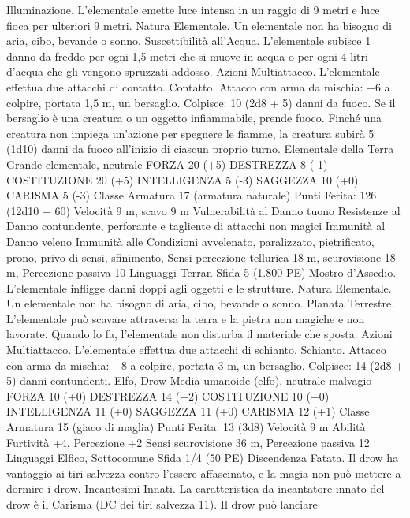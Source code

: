 \begin{multicols}{2}
Illuminazione. L’elementale emette luce intensa in un raggio di
9 metri e luce fioca per ulteriori 9 metri.
Natura Elementale. Un elementale non ha bisogno di aria, cibo,
bevande o sonno.
Suscettibilità all’Acqua. L’elementale subisce 1 danno da freddo
per ogni 1,5 metri che si muove in acqua o per ogni 4 litri
d’acqua che gli vengono spruzzati addosso.
Azioni
Multiattacco. L’elementale effettua due attacchi di contatto.
Contatto. Attacco con arma da mischia: +6 a colpire, portata 1,5
m, un bersaglio.
Colpisce: 10 (2d8 + 5) danni da fuoco. Se il bersaglio è una
creatura o un oggetto infiammabile, prende fuoco. Finché una
creatura non impiega un’azione per spegnere le fiamme, la
creatura subirà 5 (1d10) danni da fuoco all’inizio di ciascun
proprio turno.
Elementale della Terra
Grande elementale, neutrale
FORZA 20 (+5)
DESTREZZA 8 (-1)
COSTITUZIONE 20 (+5)
INTELLIGENZA 5 (-3)
SAGGEZZA 10 (+0)
CARISMA 5 (-3)
Classe Armatura 17 (armatura naturale)
\hspace*{0pt}\hfill{Punti Ferita}: 126 (12d10 + 60)
Velocità 9 m, scavo 9 m
Vulnerabilità al Danno tuono
Resistenze al Danno contundente, perforante e tagliente di
attacchi non magici
Immunità al Danno veleno
Immunità alle Condizioni avvelenato, paralizzato, pietrificato,
prono, privo di sensi, sfinimento,
Sensi percezione tellurica 18 m, scurovisione 18 m, Percezione
passiva 10
Linguaggi Terran
Sfida 5 (1.800 PE)
Mostro d’Assedio. L’elementale infligge danni doppi agli oggetti
e le strutture.
Natura Elementale. Un elementale non ha bisogno di aria, cibo,
bevande o sonno.
Planata Terrestre. L’elementale può scavare attraversa la terra e
la pietra non magiche e non lavorate. Quando lo fa, l’elementale
non disturba il materiale che sposta.
Azioni
Multiattacco. L’elementale effettua due attacchi di schianto.
Schianto. Attacco con arma da mischia: +8 a colpire, portata 3
m, un bersaglio.
Colpisce: 14 (2d8 + 5) danni contundenti.
Elfo, Drow
Media umanoide (elfo), neutrale malvagio
FORZA 10 (+0)
DESTREZZA 14 (+2)
COSTITUZIONE 10 (+0)
INTELLIGENZA 11 (+0)
SAGGEZZA 11 (+0)
CARISMA 12 (+1)
Classe Armatura 15 (giaco di maglia)
\hspace*{0pt}\hfill{Punti Ferita}: 13 (3d8)
Velocità 9 m
Abilità Furtività +4, Percezione +2
Sensi scurovisione 36 m, Percezione passiva 12
Linguaggi Elfico, Sottocomune
Sfida 1/4 (50 PE)
Discendenza Fatata. Il drow ha vantaggio ai tiri salvezza contro
l’essere affascinato, e la magia non può mettere a dormire i
drow.
Incantesimi Innati. La caratteristica da incantatore innato del
drow è il Carisma (DC dei tiri salvezza 11). Il drow può lanciare

\end{multicols}
